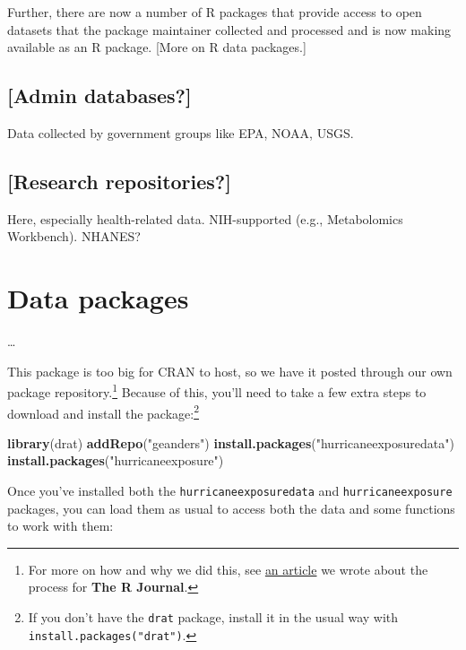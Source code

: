 \documentclass[]{tufte-book}
\newenvironment{Shaded}{}{}
\newcommand{\KeywordTok}[1]{\textcolor[rgb]{0.00,0.44,0.13}{\textbf{#1}}}
\newcommand{\NormalTok}[1]{#1}
\newcommand{\StringTok}[1]{\textcolor[rgb]{0.25,0.44,0.63}{#1}}
\begin{document}
Further, there are now a number of R packages that provide access to open datasets that the
package maintainer collected and processed and is now making available as an R package.
{[}More on R data packages.{]}

\hypertarget{admin-databases}{%
\subsection{{[}Admin databases?{]}}\label{admin-databases}}

Data collected by government groups like EPA, NOAA, USGS.

\hypertarget{research-repositories}{%
\subsection{{[}Research repositories?{]}}\label{research-repositories}}

Here, especially health-related data.
NIH-supported (e.g., Metabolomics Workbench).
NHANES?

\hypertarget{data-packages}{%
\section{Data packages}\label{data-packages}}

\ldots{}

This package is too big for CRAN to host, so we have it posted through our own package
repository.\footnote{For more on how and why we did this, see
  \href{https://journal.r-project.org/archive/2017/RJ-2017-026/}{an article} we wrote about the
  process for \textbf{The R Journal}.} Because of this, you'll need to take a few extra steps
to download and install the package:\footnote{If you don't have the \texttt{drat} package, install it in
  the usual way with \texttt{install.packages("drat")}.}

\begin{Shaded}
\begin{Highlighting}[]
\KeywordTok{library}\NormalTok{(drat)}
\KeywordTok{addRepo}\NormalTok{(}\StringTok{"geanders"}\NormalTok{)}
\KeywordTok{install.packages}\NormalTok{(}\StringTok{"hurricaneexposuredata"}\NormalTok{)}
\KeywordTok{install.packages}\NormalTok{(}\StringTok{"hurricaneexposure"}\NormalTok{)}
\end{Highlighting}
\end{Shaded}

Once you've installed both the \texttt{hurricaneexposuredata} and \texttt{hurricaneexposure} packages, you
can load them as usual to access both the data and some functions to work with them:
\end{document}
